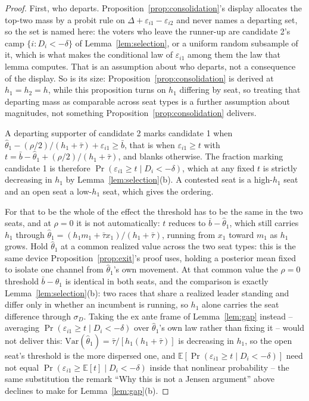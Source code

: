 \documentclass[11pt]{article}
\theoremstyle{definition}
\theoremstyle{remark}
\begin{document}
\begin{proof}
First, who departs. Proposition~\ref{prop:consolidation}'s display allocates
the top-two mass by a probit rule on $\Delta + \varepsilon_{i1} -
\varepsilon_{i2}$ and never names a departing set, so the set is named here:
the voters who leave the runner-up are candidate 2's camp
$\{i : D_i < -\delta\}$ of Lemma~\ref{lem:selection}, or a uniform random
subsample of it, which is what makes the conditional law of
$\varepsilon_{i1}$ among them the law that lemma computes. That is an
assumption about who departs, not a consequence of the display. So is its
size: Proposition~\ref{prop:consolidation} is derived at $h_1 = h_2 = h$,
while this proposition turns on $h_1$ differing by seat, so treating that
departing mass as comparable across seat types is a further assumption about
magnitudes, not something Proposition~\ref{prop:consolidation} delivers.

A departing supporter of candidate 2 marks candidate 1 when
$\hat\theta_1 - (\rho/2)/(h_1+\bar\tau) + \varepsilon_{i1} \ge \bar b$, that
is when $\varepsilon_{i1} \ge t$ with
$t = \bar b - \hat\theta_1 + (\rho/2)/(h_1 + \bar\tau)$, and blanks otherwise.
The fraction marking candidate 1 is therefore
$\Pr(\varepsilon_{i1} \ge t \mid D_i < -\delta)$, which at any fixed $t$ is
strictly decreasing in $h_1$ by Lemma~\ref{lem:selection}(b). A contested seat
is a high-$h_1$ seat and an open seat a low-$h_1$ seat, which gives the
ordering.

For that to be the whole of the effect the threshold has to be the same in the
two seats, and at $\rho = 0$ it is not automatically: $t$ reduces to
$\bar b - \hat\theta_1$, which still carries $h_1$ through
$\hat\theta_1 = (h_1 m_1 + \bar\tau x_1)/(h_1 + \bar\tau)$, running from $x_1$
toward $m_1$ as $h_1$ grows. Hold $\hat\theta_1$ at a common realized value
across the two seat types: this is the same device Proposition~\ref{prop:exit}'s
proof uses, holding a posterior mean fixed to isolate one channel from
$\hat\theta_1$'s own movement. At that common value the $\rho = 0$ threshold
$\bar b - \hat\theta_1$ is identical in both seats, and the comparison is
exactly Lemma~\ref{lem:selection}(b): two races that share a realized leader
standing and differ only in whether an incumbent is running, so $h_1$ alone
carries the seat difference through $\sigma_D$. Taking the ex ante frame of
Lemma~\ref{lem:gap} instead -- averaging
$\Pr(\varepsilon_{i1} \ge t \mid D_i < -\delta)$ over $\hat\theta_1$'s own law
rather than fixing it -- would not deliver this: $\mathrm{Var}(\hat\theta_1)
= \bar\tau/[h_1(h_1+\bar\tau)]$ is decreasing in $h_1$, so the open seat's
threshold is the more dispersed one, and
$\mathbb{E}[\Pr(\varepsilon_{i1}\ge t \mid D_i<-\delta)]$ need not equal
$\Pr(\varepsilon_{i1}\ge \mathbb{E}[t]\mid D_i<-\delta)$ inside that nonlinear
probability -- the same substitution the remark ``Why this is not a Jensen
argument'' above declines to make for Lemma~\ref{lem:gap}(b).
\end{proof}
\end{document}
